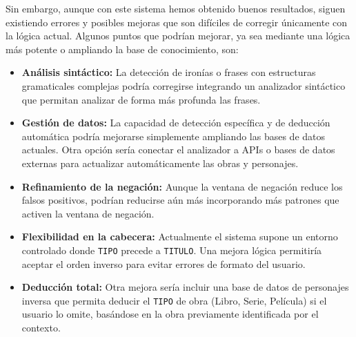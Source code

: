 \documentclass{article}
\begin{document}
Sin embargo, aunque con este sistema hemos obtenido buenos resultados, siguen existiendo errores y posibles mejoras que son difíciles de corregir únicamente con la lógica actual. Algunos puntos que podrían mejorar, ya sea mediante una lógica más potente o ampliando la base de conocimiento, son:

\begin{itemize}
    \item \textbf{Análisis sintáctico:} La detección de ironías o frases con estructuras gramaticales complejas podría corregirse integrando un analizador sintáctico que permitan analizar de forma más profunda las frases.
    \item \textbf{Gestión de datos:} La capacidad de detección específica y de deducción automática podría mejorarse simplemente ampliando las bases de datos actuales. Otra opción sería conectar el analizador a APIs o bases de datos externas para actualizar automáticamente las obras y personajes.
    \item \textbf{Refinamiento de la negación:} Aunque la ventana de negación reduce los falsos positivos, podrían reducirse aún más incorporando más patrones que activen la ventana de negación.
    \item \textbf{Flexibilidad en la cabecera:} Actualmente el sistema supone un entorno controlado donde \texttt{TIPO} precede a \texttt{TITULO}. Una mejora lógica permitiría aceptar el orden inverso para evitar errores de formato del usuario.
    \item \textbf{Deducción total:} Otra mejora sería incluir una base de datos de personajes inversa que permita deducir el \texttt{TIPO} de obra (Libro, Serie, Película) si el usuario lo omite, basándose en la obra previamente identificada por el contexto.
\end{itemize}
\end{document}
